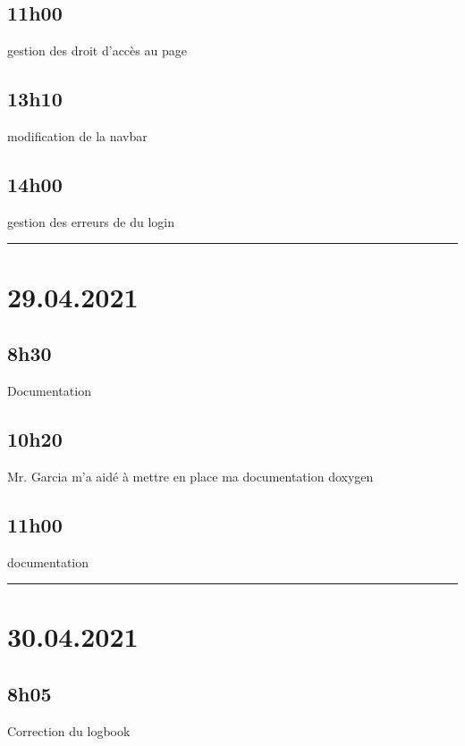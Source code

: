 \documentclass[a4paper,12pt,french]{sphinxmanual}
\begin{document}
\subsection{11h00}
\label{\detokenize{logbook:id45}}
\sphinxAtStartPar
gestion des droit d’accès au page


\subsection{13h10}
\label{\detokenize{logbook:id46}}
\sphinxAtStartPar
modification de la navbar


\subsection{14h00}
\label{\detokenize{logbook:id47}}
\sphinxAtStartPar
gestion des erreurs de du login


\bigskip\hrule\bigskip



\section{29.04.2021}
\label{\detokenize{logbook:id48}}

\subsection{8h30}
\label{\detokenize{logbook:id49}}
\sphinxAtStartPar
Documentation


\subsection{10h20}
\label{\detokenize{logbook:id50}}
\sphinxAtStartPar
Mr. Garcia m’a aidé à mettre en place ma documentation doxygen


\subsection{11h00}
\label{\detokenize{logbook:id51}}
\sphinxAtStartPar
documentation


\bigskip\hrule\bigskip



\section{30.04.2021}
\label{\detokenize{logbook:id52}}

\subsection{8h05}
\label{\detokenize{logbook:id53}}
\sphinxAtStartPar
Correction du logbook
\end{document}
